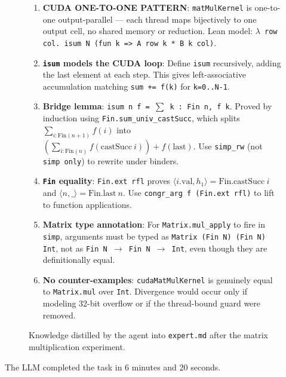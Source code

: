 \documentclass{article}
\begin{document}
\begin{figure}[H]
\begin{promptbox}
\begin{enumerate}
    \item \textbf{CUDA ONE-TO-ONE PATTERN}: \texttt{matMulKernel} is one-to-one output-parallel — each thread maps bijectively to one output cell, no shared memory or reduction. Lean model: \texttt{$\lambda$ row col. isum N (fun k => A row k * B k col)}.

    \item \textbf{\texttt{isum} models the CUDA loop}: Define \texttt{isum} recursively, adding the last element at each step. This gives left-associative accumulation matching \texttt{sum += f(k)} for \texttt{k=0..N-1}.

    \item \textbf{Bridge lemma}: \texttt{isum n f = $\sum$ k : Fin n, f k}. Proved by induction using \texttt{Fin.sum\_univ\_castSucc}, which splits $\sum_{i : \text{Fin}(n+1)} f(i)$ into $(\sum_{i : \text{Fin}(n)} f(\text{castSucc}\ i)) + f(\text{last})$. Use \texttt{simp\_rw} (not \texttt{simp only}) to rewrite under binders.

    \item \textbf{\texttt{Fin} equality}: \texttt{Fin.ext rfl} proves $\langle i.\text{val}, h_1\rangle = \text{Fin.castSucc}\ i$ and $\langle n, \_\rangle = \text{Fin.last}\ n$. Use \texttt{congr\_arg f (Fin.ext rfl)} to lift to function applications.

    \item \textbf{Matrix type annotation}: For \texttt{Matrix.mul\_apply} to fire in \texttt{simp}, arguments must be typed as \texttt{Matrix (Fin N) (Fin N) Int}, not as \texttt{Fin N $\rightarrow$ Fin N $\rightarrow$ Int}, even though they are definitionally equal.

    \item \textbf{No counter-examples}: \texttt{cudaMatMulKernel} is genuinely equal to \texttt{Matrix.mul} over \texttt{Int}. Divergence would occur only if modeling 32-bit overflow or if the thread-bound guard were removed.
\end{enumerate}
\end{promptbox}
\caption{Knowledge distilled by the agent into \texttt{expert.md} after the matrix multiplication experiment.}
\label{fig:lean-expert-knowledge}
\end{figure}

The LLM completed the task in 6 minutes and 20 seconds.
\end{document}
